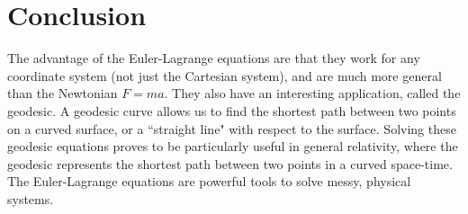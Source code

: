 \documentclass[%
 amsmath,amssymb,
aps,
 fleqn,
 notitlepage,
]{revtex4-2}
\begin{document}
\section{Conclusion}

The advantage of the Euler-Lagrange equations are that they work for any coordinate system (not just the Cartesian system), and are much more general than the Newtonian $F = ma$. They also have an interesting application, called the geodesic. A geodesic curve allows us to find the shortest path between two points on a curved surface, or a “straight line" with respect to the surface. Solving these geodesic equations proves to be particularly useful in general relativity, where the geodesic represents the shortest path between two points in a curved space-time. The Euler-Lagrange equations are powerful tools to solve messy, physical systems.
\end{document}
